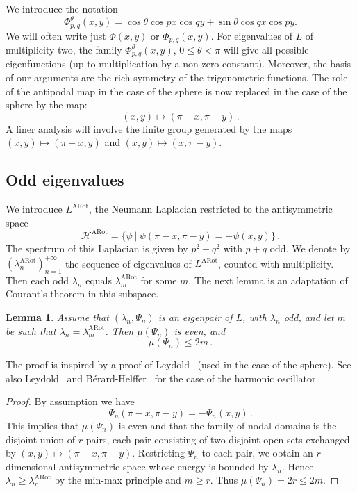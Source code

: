 \documentclass[a4paper,reqno,11pt]{amsart}
\newtheorem{lemma}[thm]{Lemma}
\theoremstyle{remark}
\theoremstyle{definition}
\numberwithin{equation}{section}
\begin{document}
We introduce the notation
\begin{equation}
\label{eq:Phidef}
\Phi_{p,q}^{\theta}(x,y) = \cos\theta\cos px\cos qy+\sin\theta\cos qx\cos py.
\end{equation}
We will often write just $\Phi(x,y)$ or $\Phi_{p,q}(x,y)$. For eigenvalues
of $L$ of multiplicity two, the family $\Phi_{p,q}^{\theta}(x,y)$, 
$0\leq \theta<\pi$ 
will give all possible eigenfunctions (up to multiplication by a non zero 
constant). Moreover, the basis of our arguments
are the rich symmetry of the trigonometric functions. The role of the 
antipodal map in the case of the sphere is now replaced in the case of the 
sphere by the map:
\[
(x,y) \mapsto (\pi-x,\pi -y)\,.
\]
A finer analysis will involve the finite group generated by the maps 
$(x,y)\mapsto (\pi-x,y)$ and $(x,y)\mapsto (x,\pi-y)$.

\subsection{Odd eigenvalues} 
We introduce $L^{\text{ARot}}$, the Neumann Laplacian restricted to the 
antisymmetric space 
\[
\mathcal H^{\text{ARot}} = \{\psi~|~\psi(\pi-x,\pi-y)=-\psi(x,y)\}\,.
\]
The spectrum of this Laplacian is given by $p^2 + q^2$ with $p+q$ odd. We 
denote by $(\lambda_n^{\text{ARot}})_{n=1}^{+\infty}$ the sequence of 
eigenvalues of $L^{\text{ARot}}$, counted with multiplicity. Then each odd
$\lambda_n$ equals $\lambda_m^{\text{ARot}}$ for some $m$. The next lemma is 
an adaptation of Courant's theorem in this subspace.
\begin{lemma}
\label{lem:antisymmetric}
Assume that $(\lambda_n,\Psi_n)$ is an eigenpair of $L$, with $\lambda_n$ odd,
and let $m$ be such that $\lambda_n=\lambda_m^{\text{ARot}}$. 
Then $\mu(\Psi_n)$ is even, and 
\[
\mu(\Psi_n) \leq 2 m\,.
\]
\end{lemma}
The proof is inspired by a proof of Leydold~\cite{Ley} (used in the case of the 
sphere). See also Leydold~\cite{Ley0} and  B\'erard-Helffer~\cite{BH2} for the 
case of the harmonic oscillator.

\begin{proof}
By assumption we have
\[
\Psi_n(\pi-x,\pi-y)=-\Psi_n(x,y)\,.
\]
This implies that $\mu(\Psi_n)$ is even and that the family of nodal domains 
is the disjoint union of $r$ pairs, each pair consisting of two disjoint open 
sets exchanged by $(x,y) \mapsto (\pi -x, \pi -y)$. Restricting $\Psi_n$ 
to each pair, we obtain an $r$-dimensional antisymmetric space whose energy 
is bounded by $\lambda_n$. Hence $\lambda_n \geq \lambda_r^{\text{ARot}}$ by the 
min-max principle and $m \geq r$. Thus $\mu(\Psi_n)=2r\leq 2m$.
\end{proof}
\end{document}
